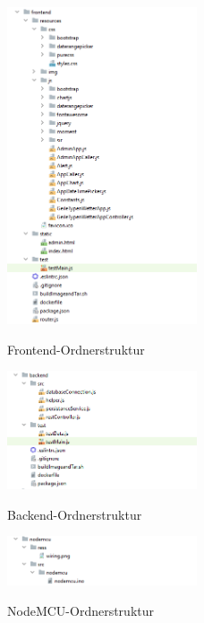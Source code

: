 \label{anh:Projekt-Architektur}
\begin{figure}[H]
	\centering
	\begin{minipage}[t]{1\textwidth}
		\caption{Frontend-Ordnerstruktur}
		\includegraphics[width=0.5\textwidth]{img/dir_struc_frontend.png}\\
		\label{fig:dir_struc_frontend}
	\end{minipage}
\end{figure}
\begin{figure}[H]
	\centering
	\begin{minipage}[t]{1\textwidth}
		\caption{Backend-Ordnerstruktur}
		\includegraphics[width=0.5\textwidth]{img/dir_struc_backend.png}\\
		\label{fig:dir_struc_backend}
	\end{minipage}
\end{figure}
\begin{figure}[H]
    \centering
    \begin{minipage}[t]{1\textwidth}
        \caption{NodeMCU-Ordnerstruktur}
        \includegraphics[width=0.5\textwidth]{img/dir_struc_nodemcu.png}\\
        \label{fig:dir_struc_nodemcu}
    \end{minipage}
\end{figure}

